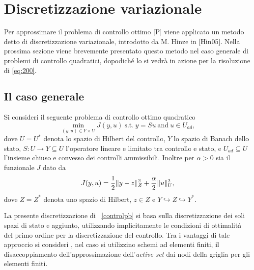 \section{Discretizzazione variazionale}
\label{chap:DiscVar}
Per approssimare il problema di controllo ottimo [P] viene applicato un metodo detto di discretizzazione variazionale, introdotto da M. Hinze in [Hin05]. Nella prossima sezione viene brevemente presentato questo metodo nel caso generale di problemi di controllo quadratici, dopodiché lo si vedrà in azione per  la risoluzione di \ref{eq:200}.   

\subsection{Il caso generale}

Si consideri il seguente problema di controllo ottimo quadratico
\begin{equation}
\label{controlpb}
\min_{(y,u)\in Y\times U} J(y,u)   \ \text{s.t.} \ y=Su \  \text{and} \ u\in U_{ad},
\end{equation}
dove $ U=U^*$ denota lo spazio di Hilbert del controllo, $ Y $ lo spazio di Banach dello stato, $ S:U\to Y\subseteq U $ l'operatore lineare e limitato tra controllo e stato, e $ U_{ad}\subseteq U $ l'insieme chiuso e convesso dei controlli ammissibili. Inoltre per $ \alpha>0 $ sia il funzionale $ J $ dato da 
\begin{equation}
J(y,u)=\frac{1}{2}\lVert y-z\rVert^2_Z + \frac{\alpha}{2}\lVert u\rVert^2_U,
\end{equation}
dove $ Z=Z^* $ denota uno spazio di Hilbert, $ z\in Z $ e $ Y\hookrightarrow Z\hookrightarrow Y^* $.   

La presente  discretizzazione di ~\eqref{controlpb} si basa sulla discretizzazione dei soli spazi di stato e aggiunto, utilizzando implicitamente le condizioni di ottimalità del primo ordine per la discretizzazione del controllo. Tra i vantaggi di tale approccio si consideri , nel caso si utilizzino schemi ad elementi finiti,  il disaccoppiamento dell'approssimazione dell'\textit{active set} dai nodi della griglia per gli elementi finiti. 

